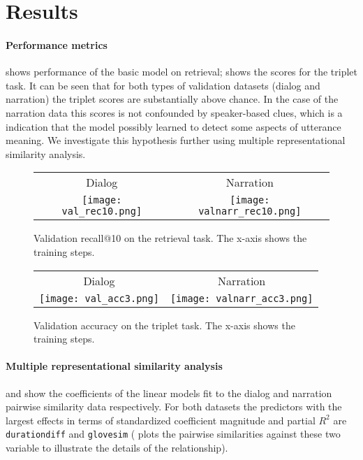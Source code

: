 \section{Results}
\label{sec:results}
\paragraph{Performance metrics}
  shows performance of the basic model on
 retrieval;  shows the scores for the triplet
 task. It can be seen that for both types of validation datasets
 (dialog and narration) the triplet scores are substantially above
 chance. In the case of the narration data this scores is not
 confounded by speaker-based clues, which is a indication that the
 model possibly learned to detect some aspects of utterance
 meaning. We investigate this hypothesis further using multiple
 representational similarity analysis.
 

\begin{figure}
  \centering
  \begin{tabular}{cc}
    Dialog & Narration \\
    \texttt{[image: val\_rec10.png]} & \texttt{[image: valnarr\_rec10.png]}\\
  \end{tabular}
  \caption{Validation recall@10 on the retrieval task. The x-axis
    shows the training steps.}
  \label{fig:retrieval}
\end{figure}

\begin{figure}
  \centering
  \begin{tabular}{cc}
    Dialog & Narration \\
    \texttt{[image: val\_acc3.png]}  & \texttt{[image: valnarr\_acc3.png]}\\
  \end{tabular}
  \caption{Validation accuracy on the triplet task. The x-axis shows
    the training steps.}
  \label{fig:triplet}
\end{figure}

\paragraph{Multiple representational similarity analysis}
 and  show the coefficients
of the linear models fit to the dialog and narration pairwise
similarity data respectively. For both datasets the predictors with
the largest effects in terms of standardized coefficient magnitude and
partial $R^2$ are {\tt durationdiff} and {\tt glovesim}
( plots the pairwise similarities
against these two variable to illustrate the details of the
relationship).
 
